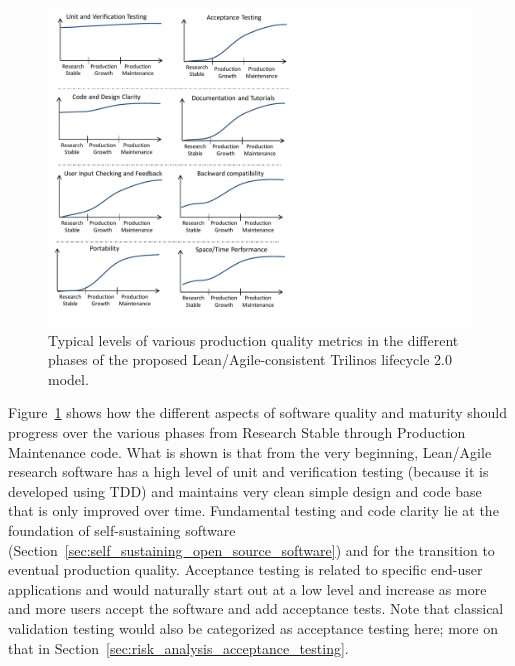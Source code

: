 \documentclass[11pt]{SANDreport}
\begin{document}
\begin{figure}
\begin{center}
\includegraphics[trim = 0.1in 0.1in 4.0in 0.1in, scale=0.85]
{ImprovementsInDevelopmentPhases}
{}\caption{Typical levels of various production quality metrics in the
different phases of the proposed Lean/Agile-consistent Trilinos
lifecycle 2.0 model.}
\label{fig:ImprovementsInDevelopmentPhases}
\end{center}
\end{figure}

Figure~\ref{fig:ImprovementsInDevelopmentPhases} shows how the
different aspects of software quality and maturity should progress
over the various phases from Research Stable through Production
Maintenance code.  What is shown is that from the very beginning,
Lean/Agile research software has a high level of unit and verification
testing (because it is developed using TDD) and maintains very clean
simple design and code base that is only improved over time.
Fundamental testing and code clarity lie at the foundation of
self-sustaining software
(Section~\ref{sec:self_sustaining_open_source_software}) and for the
transition to eventual production quality.  Acceptance testing is
related to specific end-user applications and would naturally start
out at a low level and increase as more and more users accept the
software and add acceptance tests.  Note that classical validation
testing would also be categorized as acceptance testing here; more on
that in Section~\ref{sec:risk_analysis_acceptance_testing}.
\end{document}

